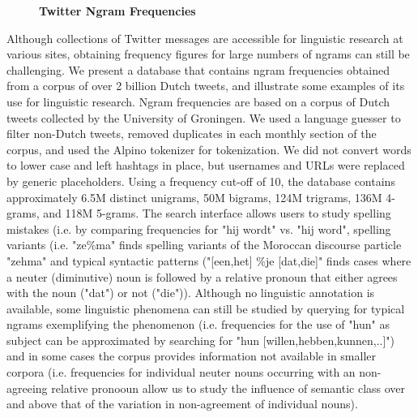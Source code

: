 \documentclass[10pt, a4paper, twopage, headinclude, footinclude, BCOR5mm]{scrartcl}
\begin{document}
\newpage

\begin{figure}[t!]
\centering
\large\textbf{Twitter Ngram Frequencies}
\vspace*{0.5cm}
\end{figure}


        \begin{table}[t!]
    \end{table}

\noindent
Although collections of Twitter messages are accessible for linguistic research at various sites, obtaining frequency figures for large numbers of ngrams can still be challenging. We present a database that contains ngram frequencies  obtained from a corpus of over 2 billion Dutch tweets, and illustrate some examples of its use for linguistic research.   Ngram frequencies are based on a corpus of Dutch tweets collected by the University of Groningen.  We used a language guesser to filter non-Dutch tweets, removed duplicates in each monthly section of the corpus, and used the Alpino tokenizer for tokenization. We did not convert words to lower case and left hashtags in place, but usernames and URLs were replaced by generic placeholders.  Using a frequency cut-off of 10, the database contains approximately 6.5M distinct unigrams, 50M bigrams, 124M trigrams, 136M 4-grams, and 118M 5-grams.   The search interface allows users to study spelling mistakes (i.e. by comparing frequencies for "hij wordt" vs. "hij word", spelling variants (i.e.  "ze\%ma" finds spelling variants of the Moroccan discourse particle "zehma" and typical syntactic patterns ("[een,het] \%je [dat,die]" finds cases where a neuter (diminutive) noun is followed by a relative pronoun that either agrees with the noun ("dat") or not ("die")). Although no linguistic annotation is available, some linguistic phenomena can still be studied by querying for typical ngrams exemplifying the phenomenon (i.e. frequencies for the use of "hun" as subject can be approximated by searching for "hun [willen,hebben,kunnen,..]") and  in some cases the corpus provides information not available in smaller corpora (i.e. frequencies for individual neuter nouns occurring with an non-agreeing relative pronooun allow us to study the influence of semantic class over and above that  of the variation in non-agreement of individual nouns).
\end{document}
